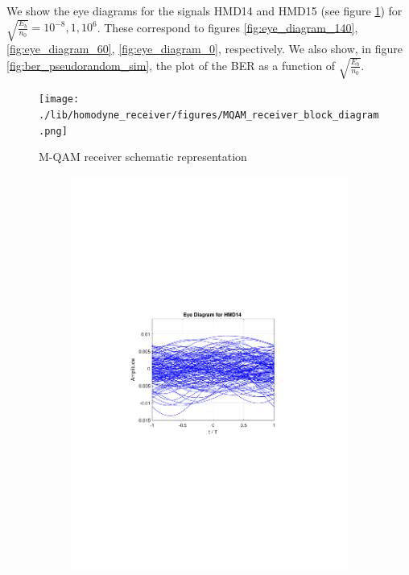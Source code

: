 We show the eye diagrams for the signals HMD14 and HMD15 (see figure \ref{fig:MQAM_receiver}) for $\sqrt{\frac{E_b}{n_0}}=10^{-8},1,10^6$. These correspond to figures \ref{fig:eye_diagram_140}, \ref{fig:eye_diagram_60}, \ref{fig:eye_diagram_0}, respectively. We also show, in figure \ref{fig:ber_pseudorandom_sim}, the plot of the BER as a function of $\sqrt{\frac{E_b}{n_0}}$.

\begin{figure}[]
	\centering
	\texttt{[image: ./lib/homodyne\_receiver/figures/MQAM\_receiver\_block\_diagram.png]}
	\caption{M-QAM receiver schematic representation}
	\label{fig:MQAM_receiver}
\end{figure}

\begin{figure}
	\centering
	\begin{subfigure}{.5\textwidth}
		\centering
		\includegraphics[clip, trim=5cm 10cm 5cm 10cm, width=\textwidth]{./sdf/m_qam_system/figures/HMD14_eye_diagram_140.pdf}

\end{subfigure}
\end{figure}
